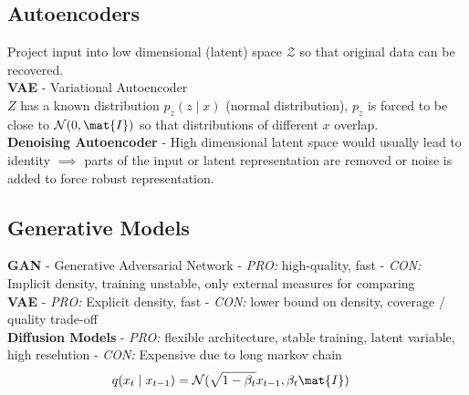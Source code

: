 \begin{multicols}{2}
\begin{mdframed}[style=eqbox]
        \subsection{Autoencoders}
        Project input into low dimensional (latent) space $\mathcal{Z}$ so that original data can be recovered.\\
        \textbf{VAE} - Variational Autoencoder\\
        $Z$ has a known distribution $p_z(z \mid x)$ (normal distribution), $p_z$ is forced to be close to $\mathcal{N}(0, \mat{I})$ so that distributions of different $x$ overlap.\\
        \textbf{Denoising Autoencoder} - High dimensional latent space would usually lead to identity $\implies$ parts of the input or latent representation are removed or noise is added to force robust representation.\\
    \end{mdframed}

    \begin{mdframed}[style=eqbox]
        \subsection{Generative Models}
        \textbf{GAN} - Generative Adversarial Network - \textit{PRO:} high-quality, fast - \textit{CON:} Implicit density, training unstable, only external measures for comparing\\
        \textbf{VAE} - \textit{PRO:} Explicit density, fast - \textit{CON:} lower bound on density, coverage / quality trade-off\\
        \textbf{Diffusion Models} - \textit{PRO:} flexible architecture, stable training, latent variable, high reselution - \textit{CON:} Expensive due to long markov chain
        \begin{align*}
            q(x_t \mid x_{t-1}) &= \mathcal{N}(\sqrt{1-\beta_t}x_{t-1},\beta_t \mat{I})
        \end{align*}
    \end{mdframed}
\end{multicols}


